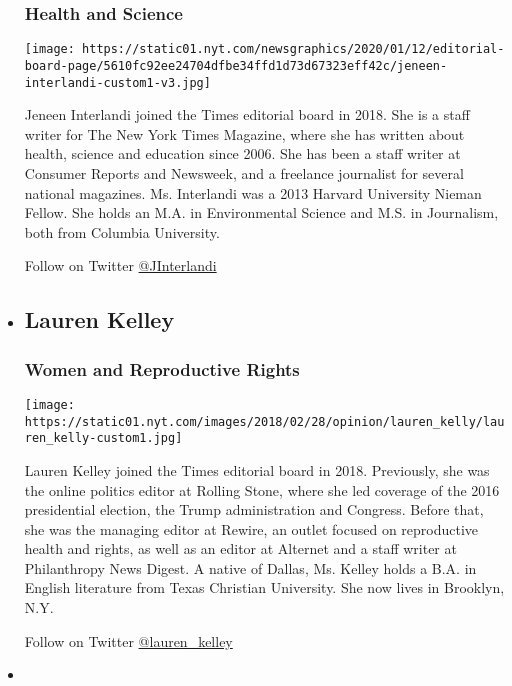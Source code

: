 \begin{itemize}
  \hypertarget{health-and-science}{%
  \subsubsection{Health and Science}\label{health-and-science}}

  \texttt{[image: https://static01.nyt.com/newsgraphics/2020/01/12/editorial-board-page/5610fc92ee24704dfbe34ffd1d73d67323eff42c/jeneen-interlandi-custom1-v3.jpg]}

  Jeneen Interlandi joined the Times editorial board in 2018. She is a
  staff writer for The New York Times Magazine, where she has written
  about health, science and education since 2006. She has been a staff
  writer at Consumer Reports and Newsweek, and a freelance journalist
  for several national magazines. Ms. Interlandi was a 2013 Harvard
  University Nieman Fellow. She holds an M.A. in Environmental Science
  and M.S. in Journalism, both from Columbia University.

  Follow on Twitter \href{http://twitter.com/JInterlandi}{@JInterlandi}
\item
  \hypertarget{lauren-kelley}{%
  \subsection{Lauren Kelley}\label{lauren-kelley}}

  \hypertarget{women-and-reproductive-rights}{%
  \subsubsection{Women and Reproductive
  Rights}\label{women-and-reproductive-rights}}

  \texttt{[image: https://static01.nyt.com/images/2018/02/28/opinion/lauren\_kelly/lauren\_kelly-custom1.jpg]}

  Lauren Kelley joined the Times editorial board in 2018. Previously,
  she was the online politics editor at Rolling Stone, where she led
  coverage of the 2016 presidential election, the Trump administration
  and Congress. Before that, she was the managing editor at Rewire, an
  outlet focused on reproductive health and rights, as well as an editor
  at Alternet and a staff writer at Philanthropy News Digest. A native
  of Dallas, Ms. Kelley holds a B.A. in English literature from Texas
  Christian University. She now lives in Brooklyn, N.Y.

  Follow on Twitter
  \href{http://twitter.com/lauren_kelley}{@lauren\_kelley}
\item
  \hypertarget{alex-kingsbury}{%
}
\end{itemize}
